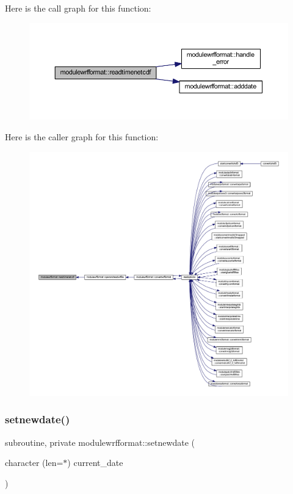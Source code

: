 Here is the call graph for this function\+:\nopagebreak
\begin{figure}[H]
\begin{center}
\leavevmode
\includegraphics[width=350pt]{namespacemodulewrfformat_af33b325d2707c25986c4337ea9954b91_cgraph}
\end{center}
\end{figure}
Here is the caller graph for this function\+:\nopagebreak
\begin{figure}[H]
\begin{center}
\leavevmode
\includegraphics[width=350pt]{namespacemodulewrfformat_af33b325d2707c25986c4337ea9954b91_icgraph}
\end{center}
\end{figure}
\mbox{\label{namespacemodulewrfformat_a059682013c76ca30c57ffaaa268179f3}} 
\subsubsection{\texorpdfstring{setnewdate()}{setnewdate()}}
{\footnotesize\ttfamily subroutine, private modulewrfformat\+::setnewdate (\begin{DoxyParamCaption}\item[{character (len=$\ast$)}]{current\+\_\+date }\end{DoxyParamCaption})\hspace{0.3cm}{\ttfamily [private]}}

